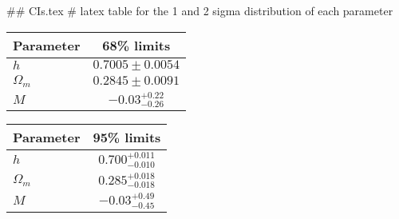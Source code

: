 ## CIs.tex
# latex table for the 1 and 2 sigma distribution of each parameter

\begin{tabular} { l  c}
 Parameter &  68\% limits\\
\hline
{\boldmath$h              $} & $0.7005\pm 0.0054          $\\
{\boldmath$\Omega_m       $} & $0.2845\pm 0.0091          $\\
{\boldmath$M              $} & $-0.03^{+0.22}_{-0.26}     $\\
\hline
\end{tabular}

\begin{tabular} { l  c}
 Parameter &  95\% limits\\
\hline
{\boldmath$h              $} & $0.700^{+0.011}_{-0.010}   $\\
{\boldmath$\Omega_m       $} & $0.285^{+0.018}_{-0.018}   $\\
{\boldmath$M              $} & $-0.03^{+0.49}_{-0.45}     $\\
\hline
\end{tabular}

